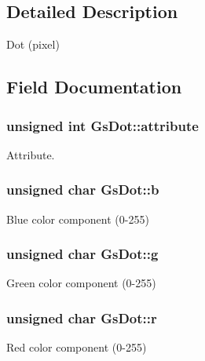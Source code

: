 \subsection{Detailed Description}
Dot (pixel) 

\subsection{Field Documentation}
\hypertarget{structGsDot_ae4d3c753ac176af37039500837a9a003}{}
\subsubsection[{attribute}]{\setlength{\rightskip}{0pt plus 5cm}unsigned int Gs\+Dot\+::attribute}\label{structGsDot_ae4d3c753ac176af37039500837a9a003}


Attribute. 

\hypertarget{structGsDot_ad0f6124b5faafdd9a5870f4c30d454d8}{}
\subsubsection[{b}]{\setlength{\rightskip}{0pt plus 5cm}unsigned char Gs\+Dot\+::b}\label{structGsDot_ad0f6124b5faafdd9a5870f4c30d454d8}


Blue color component (0-\/255) 

\hypertarget{structGsDot_adf5853b35a2beaae08ae0470b946475e}{}
\subsubsection[{g}]{\setlength{\rightskip}{0pt plus 5cm}unsigned char Gs\+Dot\+::g}\label{structGsDot_adf5853b35a2beaae08ae0470b946475e}


Green color component (0-\/255) 

\hypertarget{structGsDot_a319bcb88e61d9c53c2955741cd606664}{}
\subsubsection[{r}]{\setlength{\rightskip}{0pt plus 5cm}unsigned char Gs\+Dot\+::r}\label{structGsDot_a319bcb88e61d9c53c2955741cd606664}


Red color component (0-\/255) 

